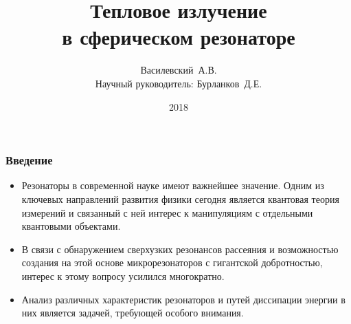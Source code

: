 \documentclass{beamer}
\title{Тепловое излучение\\ в сферическом резонаторе}
\author[Василевский~А.В.]{
    Василевский~А.В. \\[\baselineskip]
    {\footnotesize Научный руководитель: Бурланков~Д.Е.}
}
\institute[ННГУ]{Нижегородский университет им. Н.И.~Лобачевского}
\date{2018}
\begin{document}

    \frame{\titlepage}


    \begin{frame}\frametitle{Введение}

        \begin{itemize}

            \item Резонаторы в современной науке имеют важнейшее значение. Одним из ключевых направлений развития физики сегодня является квантовая теория измерений и связанный с ней интерес к манипуляциям с отдельными квантовыми объектами.

            \item В связи с обнаружением сверхузких резонансов рассеяния и возможностью создания на этой основе микрорезонаторов с гигантской добротностью, интерес к этому вопросу усилился многократно.

            \item Анализ различных характеристик резонаторов и путей диссипации энергии в них является задачей, требующей особого внимания.

        \end{itemize}

    \end{frame}

\end{document}
